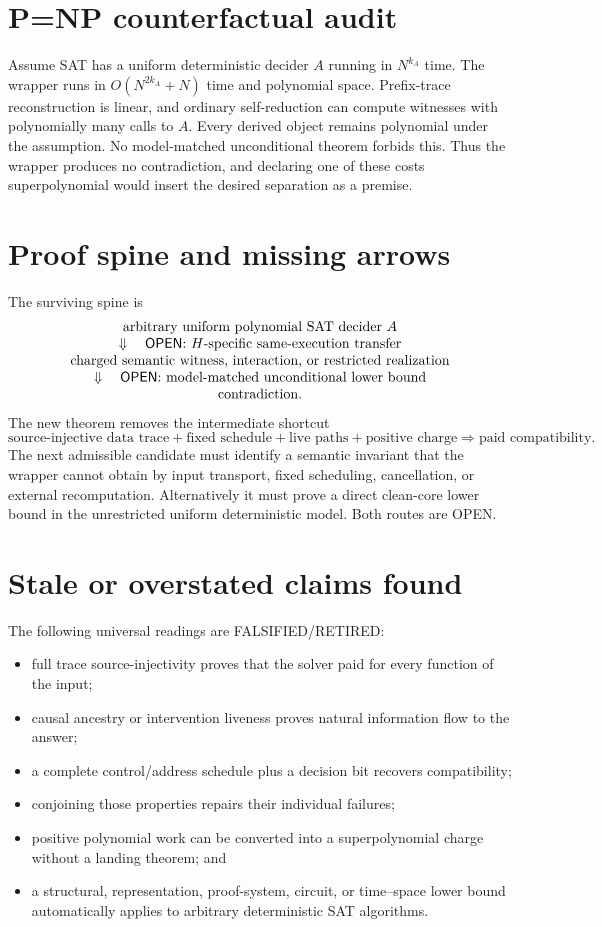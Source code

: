 \documentclass[11pt]{article}
\newcommand{\OPEN}{\textsf{OPEN}}
\newcommand{\RET}{\textsf{FALSIFIED/RETIRED}}
\begin{document}
\section*{P=NP counterfactual audit}
Assume SAT has a uniform deterministic decider $A$ running in $N^{k_A}$ time.
The wrapper runs in $O(N^{2k_A}+N)$ time and polynomial space.  Prefix-trace
reconstruction is linear, and ordinary self-reduction can compute witnesses
with polynomially many calls to $A$.  Every derived object remains polynomial
under the assumption.  No model-matched unconditional theorem forbids this.
Thus the wrapper produces no contradiction, and declaring one of these costs
superpolynomial would insert the desired separation as a premise.

\section*{Proof spine and missing arrows}
The surviving spine is
\[
\begin{array}{c}
\text{arbitrary uniform polynomial SAT decider }A\\
\Downarrow\quad\text{\OPEN: $H$-specific same-execution transfer}\\
\text{charged semantic witness, interaction, or restricted realization}\\
\Downarrow\quad\text{\OPEN: model-matched unconditional lower bound}\\
\text{contradiction.}
\end{array}
\]
The new theorem removes the intermediate shortcut
\[
\text{source-injective data trace} + \text{fixed schedule} +
\text{live paths} + \text{positive charge}
\Longrightarrow \text{paid compatibility}.
\]
The next admissible candidate must identify a semantic invariant that the
wrapper cannot obtain by input transport, fixed scheduling, cancellation, or
external recomputation.  Alternatively it must prove a direct clean-core
lower bound in the unrestricted uniform deterministic model.  Both routes are
\OPEN{}.

\section*{Stale or overstated claims found}
The following universal readings are \RET{}:
\begin{itemize}
\item full trace source-injectivity proves that the solver paid for every
function of the input;
\item causal ancestry or intervention liveness proves natural information
flow to the answer;
\item a complete control/address schedule plus a decision bit recovers
compatibility;
\item conjoining those properties repairs their individual failures;
\item positive polynomial work can be converted into a superpolynomial
charge without a landing theorem; and
\item a structural, representation, proof-system, circuit, or time--space
lower bound automatically applies to arbitrary deterministic SAT algorithms.
\end{itemize}
\end{document}
